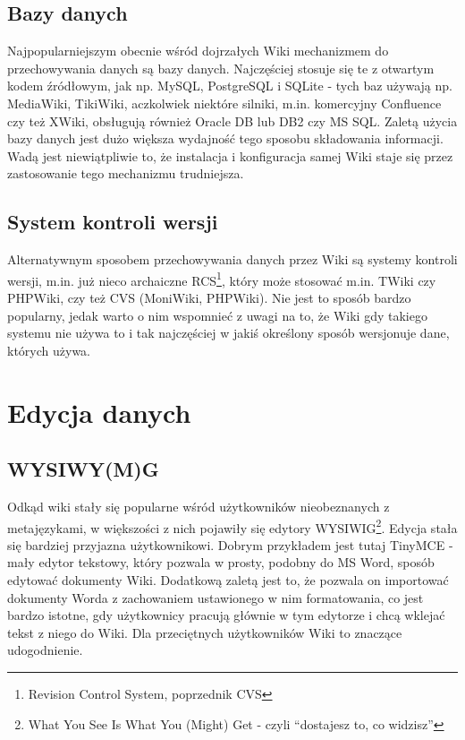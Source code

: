 \documentclass{article}
\begin{document}
	\subsection{Bazy danych}
	Najpopularniejszym obecnie wśród dojrzałych Wiki mechanizmem do przechowywania danych są bazy danych. Najczęściej stosuje się te z otwartym kodem źródłowym, jak np. MySQL, PostgreSQL i SQLite - tych baz używają np. MediaWiki, TikiWiki, aczkolwiek niektóre silniki, m.in. komercyjny Confluence czy też XWiki, obsługują również Oracle DB lub DB2 czy MS SQL. Zaletą użycia bazy danych jest dużo większa wydajność tego sposobu składowania informacji. Wadą jest niewiątpliwie to, że instalacja i konfiguracja samej Wiki staje się przez zastosowanie tego mechanizmu trudniejsza.
	\subsection{System kontroli wersji}
	Alternatywnym sposobem przechowywania danych przez Wiki są systemy kontroli wersji, m.in. już nieco archaiczne RCS\footnote{Revision Control System, poprzednik CVS}, który może stosować m.in. TWiki czy PHPWiki, czy też CVS (MoniWiki, PHPWiki). Nie jest to sposób bardzo popularny, jedak warto o nim wspomnieć z uwagi na to, że Wiki gdy takiego systemu nie używa to i tak najczęściej w jakiś określony sposób wersjonuje dane, których używa.
\newpage
\section{Edycja danych}
	\subsection{WYSIWY(M)G}
	Odkąd wiki stały się popularne wśród użytkowników nieobeznanych z metajęzykami, 
w większości z nich pojawiły się edytory WYSIWIG\footnote{What You See Is What You (Might) Get - czyli ``dostajesz to, co widzisz''}. Edycja stała się bardziej przyjazna użytkownikowi. Dobrym przykładem jest tutaj TinyMCE - mały edytor tekstowy, który pozwala w prosty, podobny do MS Word, sposób edytować dokumenty Wiki. Dodatkową zaletą jest to, że pozwala on importować dokumenty Worda z zachowaniem ustawionego w nim formatowania, co jest bardzo istotne, gdy użytkownicy pracują głównie w tym edytorze i chcą wklejać tekst z niego do Wiki. Dla przeciętnych użytkowników Wiki to znaczące udogodnienie.
\end{document}
